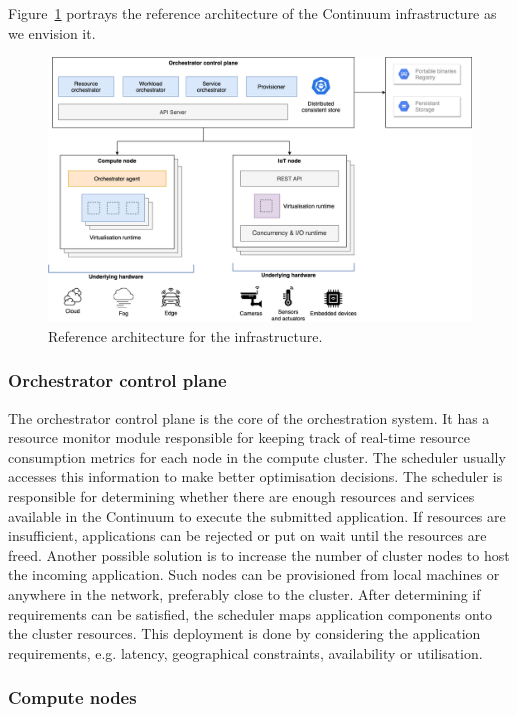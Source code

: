 Figure~\ref{fig:architecture-broad} portrays the reference architecture of the Continuum infrastructure as we envision it. 
\begin{figure}[ht]
\centering
\includegraphics[width=\columnwidth]{figures/architecture-broad}
\caption{Reference architecture for the infrastructure.}
\label{fig:architecture-broad}
\end{figure}

\subsubsection{Orchestrator control plane}

The orchestrator control plane is the core of the orchestration system. It has a resource monitor module responsible for keeping track of real-time resource consumption metrics for each node in the compute cluster. The scheduler usually accesses this information to make better optimisation decisions. The scheduler is responsible for determining whether there are enough resources and services available in the Continuum to execute the submitted application. If resources are insufficient, applications can be rejected or put on wait until the resources are freed. Another possible solution is to increase the number of cluster nodes to host the incoming application. Such nodes can be provisioned from local machines or anywhere in the network, preferably close to the cluster. After determining if requirements can be satisfied, the scheduler maps application components onto the cluster resources. This deployment is done by considering the application requirements, e.g. latency, geographical constraints, availability or utilisation.

\subsubsection{Compute nodes}

